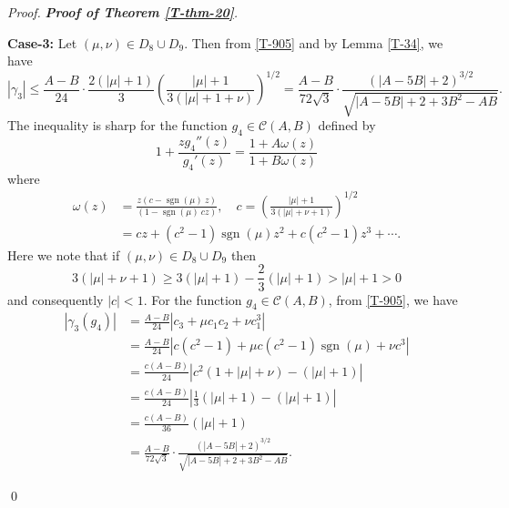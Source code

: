 \documentclass[a4paper,12pt]{amsart}
\theoremstyle{definition}
\newenvironment{pf}[1][]{%
 \vskip 3mm
 \noindent
 \ifthenelse{\equal{#1}{}}%
  {{\slshape Proof. }}%
  {{\slshape #1.} }%
 }%
{\qed\bigskip}
\begin{document}
\begin{pf}[\textbf{Proof of Theorem \ref{T-thm-20}}]
\textbf{Case-3:} Let $(\mu,\nu)\in D_8\cup D_9$. Then from \eqref{T-905} and by Lemma \ref{T-34}, we have
$$
|\gamma_3|
\le \frac{A-B}{24}\cdot \frac{2\left( |\mu| + 1 \right)}{3}  \left( \frac{|\mu| + 1}{3(|\mu| + 1 +\nu)} \right)^{1/2}
= \frac{A-B}{72\sqrt{3}} \cdot \frac{\left( |A - 5B| + 2 \right)^{3/2}}{\sqrt{|A - 5B| + 2 + 3B^{2} - AB}}.
$$
The inequality is sharp for the function $g_4\in\mathcal{C}(A,B)$ defined by
$$
1 + \frac{zg_4''(z)}{g_4'(z)} = \frac{1+A\omega(z)}{1+B\omega(z)}
$$
where
\begin{align*}
\omega(z)
&=\frac{z(c-\operatorname{sgn} (\mu)~ z)}{(1-\operatorname{sgn} (\mu)~cz)}, \quad c=\left( \frac{|\mu|+1}{3(|\mu|+\nu+1)}\right)^{1/2}\\[3mm]
&= cz+(c^2-1)\operatorname{sgn} (\mu) z^2+c(c^2-1)z^3+\cdots.
\end{align*}
Here we note that if $(\mu,\nu)\in D_8\cup D_9$ then
$$
3(|\mu|+\nu+1)\ge 3(|\mu|+1)-\frac{2}{3}(|\mu|+1)> |\mu|+1>0
$$
and consequently $|c|<1$. For the function $g_4\in\mathcal{C}(A,B)$, from \eqref{T-905}, we have
\begin{align*}
|\gamma_3(g_4)|
&= \frac{A-B}{24}\left|c_3+\mu c_{1}c_{2}+\nu c_1^3\right|\\
&=\frac{A-B}{24}\left|c(c^2-1)+\mu c(c^2-1)\operatorname{sgn} (\mu) +\nu c^3\right|\\
&=\frac{c(A-B)}{24}\left|c^2(1+|\mu|+\nu)-(|\mu|+1)\right|\\
&=\frac{c(A-B)}{24}\left|\frac{1}{3}(|\mu|+1)-(|\mu|+1)\right|\\
&=\frac{c(A-B)}{36}(|\mu|+1)\\
&= \frac{A-B}{72\sqrt{3}} \cdot \frac{\left( |A - 5B| + 2 \right)^{3/2}}{\sqrt{|A - 5B| + 2 + 3B^{2} - AB}}.
\end{align*}


\end{pf}
\end{document}
